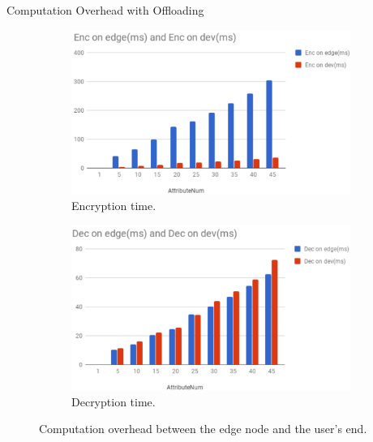 \documentclass[11pt]{beamer}
\begin{document}
\begin{frame}{Computation Overhead with Offloading}

\begin{figure}
	\begin{subfigure}{.5\textwidth}
		\centering
		\includegraphics[scale=0.17]{olenctime.png}
		\caption{Encryption time.}
		\label{fig:enctimeol}
	\end{subfigure}%
	\begin{subfigure}{.5\textwidth}
		\centering
		\includegraphics[scale=0.17]{oldectime.png}
		\caption{Decryption time.}
		\label{fig:dectimeol}
	\end{subfigure}
	\caption{Computation overhead between the edge node and the user's end.}
\end{figure}

\end{frame}
\end{document}

